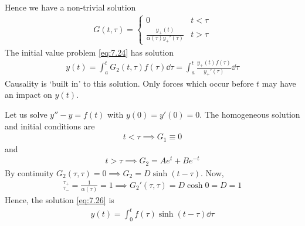 Hence we have a non-trivial solution
\begin{align} \label{eq:7.25}
	G(t, \tau) = \begin{cases}
		0 & t < \tau \\
		\frac{y_+(t)}{\alpha(\tau) y_+'(\tau)} & t > \tau
	\end{cases}
\end{align}
The initial value problem \cref{eq:7.24} has solution
\begin{align} \label{eq:7.26}
	y(t) = \int_a^t G_2(t, \tau) f(\tau) \dd{\tau} = \int_a^t \frac{y_+(t) f(\tau)}{y_+'(\tau)} \dd{\tau}
\end{align}
Causality is `built in' to this solution.
Only forces which occur before $t$ may have an impact on $y(t)$.
\begin{example}
	Let us solve $y''-y = f(t)$ with $y(0) = y'(0) = 0$.
	The homogeneous solution and initial conditions are
	\begin{align*}
		t < \tau \implies G_1 \equiv 0
	\end{align*}
	and
	\begin{align*}
		t > \tau \implies G_2 = A e^t + Be^{-t}
	\end{align*}
	By continuity $G_2(\tau, \tau) = 0 \implies G_2 = D \sinh (t - \tau)$.
	Now,
	\begin{align*}
		[G']_{\tau_-}^{\tau_+} = \frac{1}{\alpha(\tau)} = 1 \implies G_2'(\tau, \tau) = D \cosh 0 = D = 1
	\end{align*}
	Hence, the solution \cref{eq:7.26} is
	\begin{align*}
		y(t) = \int_0^t f(\tau) \sinh (t - \tau) \dd{\tau}
	\end{align*}
\end{example}